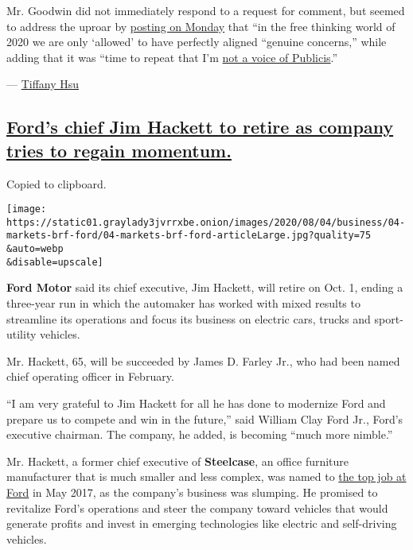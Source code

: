 Mr. Goodwin did not immediately respond to a request for comment, but
seemed to address the uproar by
\href{https://twitter.com/tomfgoodwin/status/1290340999672332291}{posting
on Monday} that ``in the free thinking world of 2020 we are only
`allowed' to have perfectly aligned ``genuine concerns,'' while adding
that it was ``time to repeat that I'm
\href{https://twitter.com/tomfgoodwin/status/1290325449529274370?s=20}{not
a voice of Publicis}.''

--- \href{https://www.nytimes3xbfgragh.onion/by/tiffany-hsu}{Tiffany
Hsu}

\hypertarget{fords-chief-jim-hackett-to-retire-as-company-tries-to-regain-momentum}{%
\subsection{\texorpdfstring{\protect\hyperlink{fords-chief-jim-hackett-to-retire-as-company-tries-to-regain-momentum}{Ford's
chief Jim Hackett to retire as company tries to regain
momentum.}}{Ford's chief Jim Hackett to retire as company tries to regain momentum.}}\label{fords-chief-jim-hackett-to-retire-as-company-tries-to-regain-momentum}}

Copied to clipboard.

\texttt{[image: https://static01.graylady3jvrrxbe.onion/images/2020/08/04/business/04-markets-brf-ford/04-markets-brf-ford-articleLarge.jpg?quality=75\\\&auto=webp\\\&disable=upscale]}

\textbf{Ford Motor} said its chief executive, Jim Hackett, will retire
on Oct. 1, ending a three-year run in which the automaker has worked
with mixed results to streamline its operations and focus its business
on electric cars, trucks and sport-utility vehicles.

Mr. Hackett, 65, will be succeeded by James D. Farley Jr., who had been
named chief operating officer in February.

``I am very grateful to Jim Hackett for all he has done to modernize
Ford and prepare us to compete and win in the future,'' said William
Clay Ford Jr., Ford's executive chairman. The company, he added, is
becoming ``much more nimble.''

Mr. Hackett, a former chief executive of \textbf{Steelcase}, an office
furniture manufacturer that is much smaller and less complex, was named
to
\href{https://www.nytimes3xbfgragh.onion/2017/05/22/business/jim-hackett-ford.html}{the
top job at Ford} in May 2017, as the company's business was slumping. He
promised to revitalize Ford's operations and steer the company toward
vehicles that would generate profits and invest in emerging technologies
like electric and self-driving vehicles.

